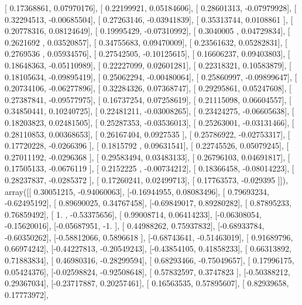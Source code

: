 \documentclass{article}
\begin{document}
       [ 0.17368861,  0.07970176],
       [ 0.22199921,  0.05184606],
       [ 0.28601313, -0.07979928],
       [ 0.32294513, -0.00685504],
       [ 0.27263146, -0.03941839],
       [ 0.35313744,  0.0108861 ],
       [ 0.20778316,  0.08124649],
       [ 0.19995429, -0.07310992],
       [ 0.3040005 ,  0.04729834],
       [ 0.2621692 ,  0.03520857],
       [ 0.34755683,  0.09470009],
       [ 0.23561632,  0.05282831],
       [ 0.2769536 ,  0.05934576],
       [ 0.27542505, -0.10125615],
       [ 0.16606237,  0.09403803],
       [ 0.18648363, -0.05110989],
       [ 0.22227099,  0.02601281],
       [ 0.22318321,  0.10583879],
       [ 0.18105634, -0.09895419],
       [ 0.25062294, -0.00480064],
       [ 0.25860997, -0.09899647],
       [ 0.20734106, -0.06277896],
       [ 0.32284326,  0.07368747],
       [ 0.29295861,  0.05247608],
       [ 0.27387841, -0.09577975],
       [ 0.16737254,  0.07258619],
       [ 0.21115098,  0.06604557],
       [ 0.34850441,  0.10240725],
       [ 0.22481211, -0.03008265],
       [ 0.23424275, -0.06605638],
       [ 0.18203823,  0.02481505],
       [ 0.25287353, -0.03536013],
       [ 0.25263001, -0.03131466],
       [ 0.28110853,  0.00368653],
       [ 0.26167404,  0.0927535 ],
       [ 0.25786922, -0.02753317],
       [ 0.17720228, -0.0266396 ],
       [ 0.1815792 ,  0.09631541],
       [ 0.22745526,  0.05079245],
       [ 0.27011192, -0.0296368 ],
       [ 0.29583494,  0.03483133],
       [ 0.26796103,  0.04691817],
       [ 0.17505133, -0.0676119 ],
       [ 0.2152225 , -0.00734212],
       [ 0.18366458, -0.08014223],
       [ 0.28237837, -0.0285372 ],
       [ 0.17260241,  0.02499713],
       [ 0.17763573, -0.029395  ]]), array([[ 0.30051215, -0.94060063],
       [-0.16944955,  0.08083496],
       [ 0.79693234, -0.62495192],
       [ 0.89690025,  0.34767458],
       [-0.69849017,  0.89280282],
       [ 0.87895233,  0.76859492],
       [ 1.        , -0.53375656],
       [ 0.99008714,  0.06414233],
       [-0.06308054, -0.15620016],
       [-0.05687951, -1.        ],
       [ 0.44988262,  0.75937832],
       [-0.68933784, -0.60350262],
       [-0.58812066,  0.5896618 ],
       [-0.68743641, -0.51463019],
       [ 0.91689796,  0.66974242],
       [-0.44227813, -0.20549243],
       [-0.43854105,  0.41858233],
       [ 0.66313892,  0.71883834],
       [ 0.46980316, -0.28299594],
       [ 0.68293466, -0.75049657],
       [ 0.17996175,  0.05424376],
       [-0.02598824, -0.92508648],
       [ 0.57832597,  0.3747823 ],
       [-0.50388212,  0.29367034],
       [-0.23717887,  0.20257461],
       [ 0.16563535,  0.57895607],
       [ 0.82939658,  0.17773972],
\end{document}
